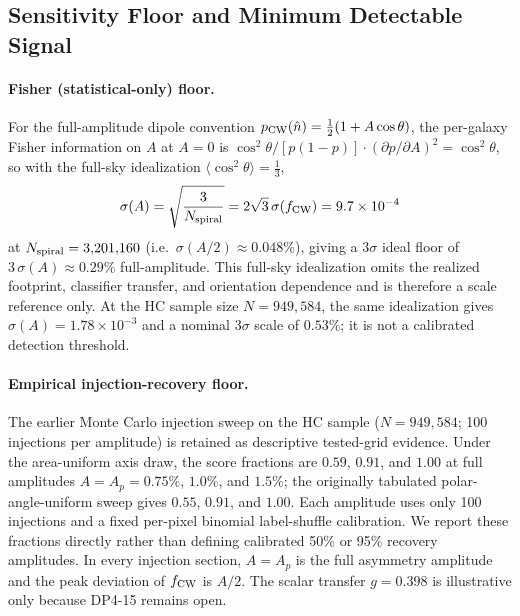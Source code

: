 \documentclass[aps,prd,twocolumn,superscriptaddress,preprintnumbers,nofootinbib,longbibliography,floatfix]{revtex4-2}
\begin{document}
\subsection{Sensitivity Floor and Minimum Detectable Signal}
\label{sec:sensitivity}

\paragraph{Fisher (statistical-only) floor.}
For the full-amplitude dipole convention $p_{\rm CW}(\hat n)=\tfrac12(1+A\cos\theta)$, the per-galaxy Fisher information on $A$ at $A=0$ is $\cos^2\theta/[p(1-p)] \cdot (\partial p/\partial A)^2 = \cos^2\theta$, so with the full-sky idealization $\langle\cos^2\theta\rangle=\tfrac13$,
\begin{equation}
\sigma(A) = \sqrt{\frac{3}{N_{\rm spiral}}} = 2\sqrt{3}\,\sigma(f_{\rm CW})
= 9.7\times10^{-4}
\label{eq:fisher_floor}
\end{equation}
at $N_{\rm spiral}=3{,}201{,}160$ (i.e.\ $\sigma(A/2)\approx0.048\%$), giving a $3\sigma$ ideal floor of $3\,\sigma(A)\approx0.29\%$ full-amplitude. This full-sky idealization omits the realized footprint, classifier transfer, and orientation dependence and is therefore a scale reference only. At the HC sample size $N=949{,}584$, the same idealization gives $\sigma(A)=1.78\times10^{-3}$ and a nominal $3\sigma$ scale of $0.53\%$; it is not a calibrated detection threshold.

\paragraph{Empirical injection-recovery floor.}
The earlier Monte Carlo injection sweep on the HC sample ($N=949{,}584$; 100 injections per amplitude) is retained as descriptive tested-grid evidence. Under the area-uniform axis draw, the score fractions are $0.59$, $0.91$, and $1.00$ at full amplitudes $A=A_p=0.75\%$, $1.0\%$, and $1.5\%$; the originally tabulated polar-angle-uniform sweep gives $0.55$, $0.91$, and $1.00$. Each amplitude uses only 100 injections and a fixed per-pixel binomial label-shuffle calibration. We report these fractions directly rather than defining calibrated 50\% or 95\% recovery amplitudes. In every injection section, $A=A_p$ is the full asymmetry amplitude and the peak deviation of $f_{\rm CW}$ is $A/2$. The scalar transfer $g=0.398$ is illustrative only because DP4-15 remains open.
\end{document}
